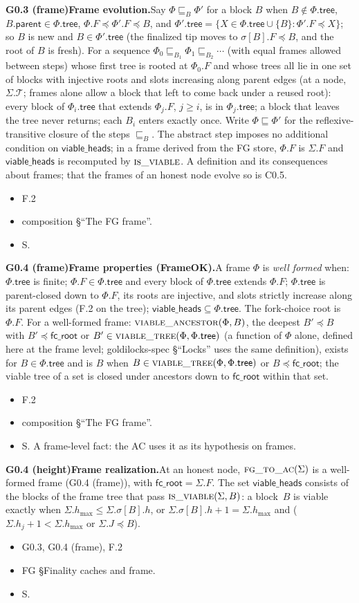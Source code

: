 \documentclass{article}
\newcommand{\parent}{\mathsf{parent}}
\newcommand{\T}{\mathcal T}
\newcommand{\hmax}{h_{\max}}
\newcommand{\Fr}{\Phi}
\newcommand{\fcroot}{\mathsf{fc\_root}}
\newcommand{\allowed}{\mathsf{viable\_heads}}
\newcommand{\fname}[1]{\text{\textsc{#1}}}
\newcommand{\filtered}{\fname{viable\_tree}}
\newcommand{\dagnode}[6]{%
\par\medskip\noindent\textbf{#1\enspace #2.}\enspace #3
\begin{itemize}[leftmargin=2.2em,itemsep=0pt,topsep=2pt]
\item[\emph{Uses}] #4
\item[\emph{Evid.}] #5
\item[\emph{Task}] #6
\end{itemize}}
\begin{document}
\dagnode{G0.3 (frame)}{Frame evolution}{Say $\Fr\sqsubseteq_B\Fr'$ for a block
$B$ when $B\notin\Fr.\mathsf{tree}$, $B.\parent\in\Fr.\mathsf{tree}$,
$\Fr.F\preceq\Fr'.F\preceq B$, and $\Fr'.\mathsf{tree}=\{X\in\Fr.\mathsf{tree}
\cup\{B\}:\Fr'.F\preceq X\}$; so $B$ is new and $B\in\Fr'.\mathsf{tree}$ (the
finalized tip moves to $\sigma[B].F\preceq B$, and the root of $B$ is fresh).  For a sequence $\Fr_0\sqsubseteq_{B_1}\Fr_1
\sqsubseteq_{B_2}\cdots$ (with equal frames allowed between steps) whose first
tree is rooted at $\Fr_0.F$ and whose trees all lie in one set of blocks with
injective roots and slots increasing along parent edges (at a node, $\Sigma.\T$;
frames alone allow a block that left to come back under a reused root): every block
of $\Fr_i.\mathsf{tree}$ that extends $\Fr_j.F$, $j\geq i$, is in
$\Fr_j.\mathsf{tree}$; a block that leaves the tree never returns; each $B_i$
enters exactly once.  Write $\Fr\sqsubseteq\Fr'$ for the reflexive-transitive
closure of the steps $\sqsubseteq_B$.  The abstract step imposes no additional
condition on $\allowed$; in a frame derived from the FG store,
$\Fr.F$ is $\Sigma.F$ and $\allowed$ is recomputed by
$\fname{is\_viable}$.  A definition and its consequences about frames; that
the frames of an honest node evolve so is C0.5.}
{F.2}{composition \S``The FG frame''.}{S.}

\dagnode{G0.4 (frame)}{Frame properties (\textsf{FrameOK})}{A frame $\Fr$ is
\emph{well formed} when: $\Fr.\mathsf{tree}$ is finite; $\Fr.F\in\Fr.\mathsf{tree}$ and every block of
$\Fr.\mathsf{tree}$ extends $\Fr.F$; $\Fr.\mathsf{tree}$ is parent-closed down
to $\Fr.F$, its roots are injective, and slots strictly increase along its
parent edges (F.2 on the tree); $\allowed\subseteq\Fr.\mathsf{tree}$. The
fork-choice root is $\Fr.F$. For a well-formed frame:
$\fname{viable\_ancestor}(\Fr,B)$, the deepest $B'\preceq B$ with
$B'\preceq\fcroot$ or $B'\in\filtered(\Fr,\Fr.\mathsf{tree})$ (a function of $\Fr$
alone, defined here at the frame level; goldilocks-spec \S``Locks'' uses the same
definition), exists for $B\in\Fr.\mathsf{tree}$ and is $B$
when $B\in\filtered(\Fr,\Fr.\mathsf{tree})$ or $B\preceq\fcroot$; the viable
tree of a set is closed under ancestors down to $\fcroot$ within that set.}
{F.2}{composition \S``The FG frame''.}{S.  A frame-level fact: the AC uses it
as its hypothesis on frames.}

\dagnode{G0.4 (height)}{Frame realization}{At an honest node,
$\fname{fg\_to\_ac}(\Sigma)$ is a well-formed frame (G0.4 (frame)), with
$\fcroot=\Sigma.F$.  The set $\allowed$ consists of the blocks of the frame
tree that pass $\fname{is\_viable}(\Sigma,B)$: a block~$B$ is viable exactly
when $\Sigma.\hmax\leq\Sigma.\sigma[B].h$, or
$\Sigma.\sigma[B].h+1=\Sigma.\hmax$ and
($\Sigma.h_j+1<\Sigma.\hmax$ or $\Sigma.J\preceq B$).}
{G0.3, G0.4 (frame), F.2}{FG \S Finality caches and frame.}{S.}
\end{document}
